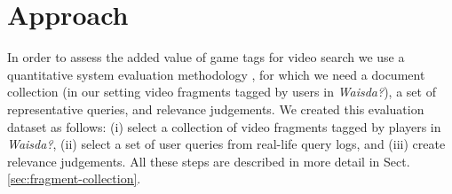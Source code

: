 \section{Approach}\label{sec:approach}
In order to assess the added value of game tags for video search we use a quantitative system evaluation methodology \cite{vorhees}, for which we need a document collection (in our setting video fragments tagged by users in \textit{Waisda?}), a set of representative queries, and relevance judgements.
We created this evaluation dataset as follows: (i) select a collection of video fragments tagged by players in \textit{Waisda?}, (ii) select a set of user queries from real-life query logs, and (iii) create relevance judgements. All these steps are described in more detail in Sect. \ref{sec:fragment-collection}.
